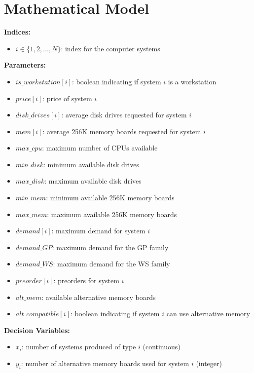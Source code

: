 \documentclass{article}
\begin{document}
\section*{Mathematical Model}

\textbf{Indices:}
\begin{itemize}
    \item $i \in \{1, 2, \ldots, N\}$: index for the computer systems
\end{itemize}

\textbf{Parameters:}
\begin{itemize}
    \item $is\_workstation[i]$: boolean indicating if system $i$ is a workstation
    \item $price[i]$: price of system $i$
    \item $disk\_drives[i]$: average disk drives requested for system $i$
    \item $mem[i]$: average 256K memory boards requested for system $i$
    \item $max\_cpu$: maximum number of CPUs available
    \item $min\_disk$: minimum available disk drives
    \item $max\_disk$: maximum available disk drives
    \item $min\_mem$: minimum available 256K memory boards
    \item $max\_mem$: maximum available 256K memory boards
    \item $demand[i]$: maximum demand for system $i$
    \item $demand\_GP$: maximum demand for the GP family
    \item $demand\_WS$: maximum demand for the WS family
    \item $preorder[i]$: preorders for system $i$
    \item $alt\_mem$: available alternative memory boards
    \item $alt\_compatible[i]$: boolean indicating if system $i$ can use alternative memory
\end{itemize}

\textbf{Decision Variables:}
\begin{itemize}
    \item $x_i$: number of systems produced of type $i$ (continuous)
    \item $y_i$: number of alternative memory boards used for system $i$ (integer)
\end{itemize}
\end{document}
